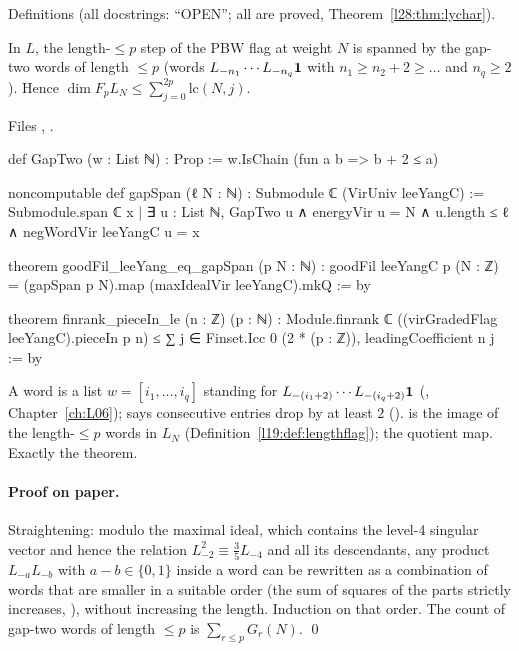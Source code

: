 \begin{status}
Definitions (all docstrings: ``OPEN''; all are proved, Theorem~\ref{l28:thm:lychar}).
\end{status}

\begin{theorem}\label{l28:thm:gapspan}
In $L$, the length-$\le p$ step of the PBW flag at weight $N$ is spanned by the gap-two words of length $\le p$ (words $L_{-n_1}\cdots L_{-n_q}\mathbf 1$ with
$n_1\ge n_2+2\ge\dots$ and $n_q\ge2$). Hence $\dim F_pL_N\le\sum_{j=0}^{2p}\mathrm{lc}(N,j)$.
\end{theorem}

\noindent Files , .
\begin{leancode}
def GapTwo (w : List ℕ) : Prop := w.IsChain (fun a b => b + 2 ≤ a)

noncomputable def gapSpan (ℓ N : ℕ) : Submodule ℂ (VirUniv leeYangC) :=
  Submodule.span ℂ
    {x | ∃ u : List ℕ, GapTwo u ∧ energyVir u = N ∧ u.length ≤ ℓ ∧ negWordVir leeYangC u = x}

theorem goodFil_leeYang_eq_gapSpan (p N : ℕ) :
    goodFil leeYangC p (N : ℤ) = (gapSpan p N).map (maxIdealVir leeYangC).mkQ := by

theorem finrank_pieceIn_le (n : ℤ) (p : ℕ) :
    Module.finrank ℂ ((virGradedFlag leeYangC).pieceIn p n) ≤
      ∑ j ∈ Finset.Icc 0 (2 * (p : ℤ)), leadingCoefficient n j := by
\end{leancode}

\begin{dictionary}
A word is a list $w=[i_1,\dots,i_q]$ standing for $L_{-(i_1+2)}\cdots L_{-(i_q+2)}\mathbf 1$ (, Chapter~\ref{ch:L06});  says
consecutive entries drop by at least $2$ ().  is the image of the length-$\le p$ words in $L_N$
(Definition~\ref{l19:def:lengthflag});  the quotient map. Exactly the theorem.
\end{dictionary}

\paragraph{Proof on paper.} Straightening: modulo the maximal ideal, which contains the level-4 singular vector and hence the relation
$L_{-2}^2\equiv\tfrac35L_{-4}$ and all its descendants, any product $L_{-a}L_{-b}$ with $a-b\in\{0,1\}$ inside a word can be rewritten as a combination of words
that are smaller in a suitable order (the sum of squares of the parts strictly increases, ), without increasing the length. Induction on that
order. The count of gap-two words of length $\le p$ is $\sum_{r\le p}G_r(N)$. \qed

